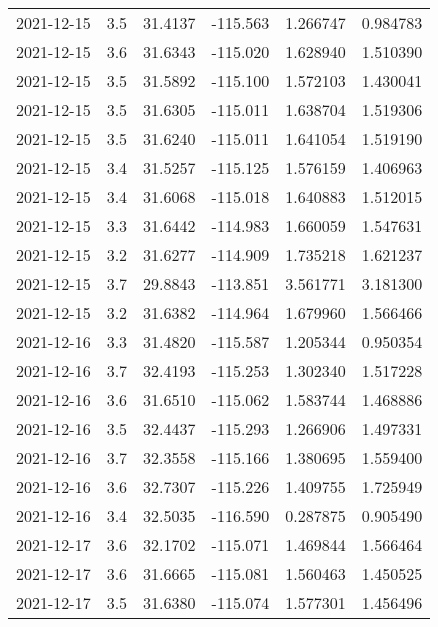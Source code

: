 \begin{tabular}{lrrrrr}
2021-12-15 &       3.5 &  31.4137 &  -115.563 &         1.266747 &         0.984783 \\
2021-12-15 &       3.6 &  31.6343 &  -115.020 &         1.628940 &         1.510390 \\
2021-12-15 &       3.5 &  31.5892 &  -115.100 &         1.572103 &         1.430041 \\
2021-12-15 &       3.5 &  31.6305 &  -115.011 &         1.638704 &         1.519306 \\
2021-12-15 &       3.5 &  31.6240 &  -115.011 &         1.641054 &         1.519190 \\
2021-12-15 &       3.4 &  31.5257 &  -115.125 &         1.576159 &         1.406963 \\
2021-12-15 &       3.4 &  31.6068 &  -115.018 &         1.640883 &         1.512015 \\
2021-12-15 &       3.3 &  31.6442 &  -114.983 &         1.660059 &         1.547631 \\
2021-12-15 &       3.2 &  31.6277 &  -114.909 &         1.735218 &         1.621237 \\
2021-12-15 &       3.7 &  29.8843 &  -113.851 &         3.561771 &         3.181300 \\
2021-12-15 &       3.2 &  31.6382 &  -114.964 &         1.679960 &         1.566466 \\
2021-12-16 &       3.3 &  31.4820 &  -115.587 &         1.205344 &         0.950354 \\
2021-12-16 &       3.7 &  32.4193 &  -115.253 &         1.302340 &         1.517228 \\
2021-12-16 &       3.6 &  31.6510 &  -115.062 &         1.583744 &         1.468886 \\
2021-12-16 &       3.5 &  32.4437 &  -115.293 &         1.266906 &         1.497331 \\
2021-12-16 &       3.7 &  32.3558 &  -115.166 &         1.380695 &         1.559400 \\
2021-12-16 &       3.6 &  32.7307 &  -115.226 &         1.409755 &         1.725949 \\
2021-12-16 &       3.4 &  32.5035 &  -116.590 &         0.287875 &         0.905490 \\
2021-12-17 &       3.6 &  32.1702 &  -115.071 &         1.469844 &         1.566464 \\
2021-12-17 &       3.6 &  31.6665 &  -115.081 &         1.560463 &         1.450525 \\
2021-12-17 &       3.5 &  31.6380 &  -115.074 &         1.577301 &         1.456496 \\

\end{tabular}
